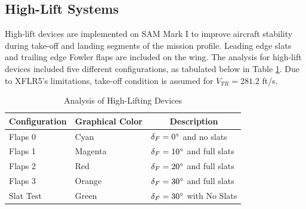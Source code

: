 \subsection{High-Lift Systems}\label{sec:highlift}
High-lift devices are implemented on SAM Mark I to improve aircraft stability during take-off and landing segments of the mission profile.  Leading edge slats and trailing edge Fowler flaps are included on the wing.  The analysis for high-lift devices included five different configurations, as tabulated below in Table \ref{tab:highlyfttest}.  Due to XFLR5's limitations, take-off condition is assumed for $V_{TR} = 281.2$ ft/s.

\begin{table}[!h]
    \centering
    \caption{Analysis of High-Lifting Devices}
    \begin{tabular}{|p{1in}|p{1in}|p{}|}\toprule
        \multicolumn{1}{c}{\textbf{Configuration}} & \multicolumn{1}{c}{\textbf{Graphical Color}}& \multicolumn{1}{c}{\textbf{Description}} \\\midrule
        Flaps 0 & Cyan & $\delta_F=0\degree$ and no slats \\ \hline
        Flaps 1 & Magenta & $\delta_F = 10\degree$ and full slats \\ \hline
        Flaps 2 & Red & $\delta_F = 20\degree$ and full slats \\\hline
        Flaps 3 & Orange & $\delta_F = 30\degree$ and full slats \\\hline
        Slat Test & Green & $\delta_F = 30\degree$ with No Slats \\ \bottomrule
    \end{tabular}
    \label{tab:highlyfttest}
\end{table}

